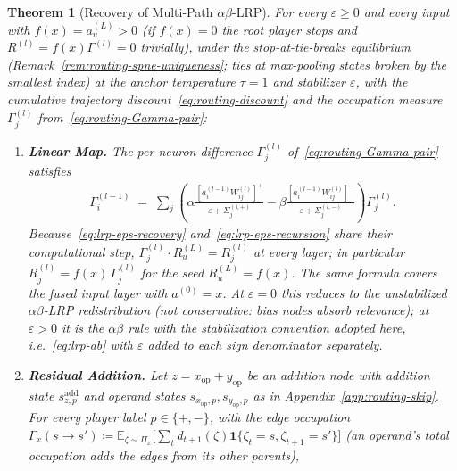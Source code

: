\documentclass[twoside]{article}
\newif\ifch \chfalse
\newcommand{\ch}[1]{\ifch\textcolor{magenta}{#1}\else#1\fi}
\providecommand{\E}{}
\renewcommand{\E}{\mathbb{E}}
\newcommand{\1}{\mathbf{1}}
\newtheorem{theorem}{Theorem}
\begin{document}
\begin{theorem}[Recovery of Multi-Path $\alpha\beta$-\ac{LRP}]\label{thm:ab-recovery}
For every $\varepsilon \ge 0$ and every input with $f(x)=a_u^{(L)}>0$ (if $f(x)=0$ the root player
stops and $R^{(l)}=f(x)\Gamma^{(l)}=0$ trivially), under the stop-at-tie-breaks equilibrium
(Remark~\ref{rem:routing-spne-uniqueness}; ties at max-pooling states broken by the smallest index)
at the anchor temperature $\tau = 1$ and stabilizer $\varepsilon$, with the cumulative trajectory
discount~\eqref{eq:routing-discount} and the occupation measure $\Gamma_j^{(l)}$
from~\eqref{eq:routing-Gamma-pair}:
\begin{enumerate}
    \item \textbf{Linear Map.} The per-neuron difference $\Gamma^{(l)}_j$ of~\eqref{eq:routing-Gamma-pair}
        satisfies
        \begin{align}\label{eq:lrp-eps-recovery}
            \Gamma^{(l-1)}_i
            \;=\; \sum_j \left(
            \alpha \frac{[a_i^{(l-1)} W_{ij}^{(l)}]^+}{\varepsilon + \Sigma_j^{(l,+)}}
            -
            \beta \frac{[a_i^{(l-1)} W_{ij}^{(l)}]^-}{\varepsilon + \Sigma_j^{(l,-)}}
            \right) \Gamma^{(l)}_j.
        \end{align}
        Because~\eqref{eq:lrp-eps-recovery} and~\eqref{eq:lrp-eps-recursion} share their computational
        step, $\Gamma^{(l)}_j \cdot R_u^{(L)} = R^{(l)}_j$ at every layer; in particular $R^{(l)}_j =
            f(x)\,\Gamma^{(l)}_j$ for the seed $R^{(L)}_u = f(x)$. The same formula covers the fused input
        layer with $a^{(0)} = x$. At $\varepsilon = 0$ this reduces to the unstabilized
        $\alpha\beta$-\ac{LRP} redistribution (not conservative: bias nodes absorb relevance); at
        $\varepsilon > 0$ \ch{it is the $\alpha\beta$ rule with the stabilization convention adopted here,
        i.e.\ \eqref{eq:lrp-ab} with $\varepsilon$ added to each sign denominator separately.}
    \item \textbf{Residual Addition.} Let $z = x_{\mathrm{op}} + y_{\mathrm{op}}$ be an addition node with
        addition state $s^{\mathrm{add}}_{z,p}$ and operand states $s_{x_{\mathrm{op}},p},
            s_{y_{\mathrm{op}},p}$ as in Appendix~\ref{app:routing-skip}. For every player label $p\in\{+,-\}$,
        with the edge occupation $\Gamma_x(s\to s')\coloneqq\E_{\zeta\sim\Pi_x}\bigl[\sum_t
            d_{t+1}(\zeta)\1\{\zeta_t=s,\zeta_{t+1}=s'\}\bigr]$ (an operand's total occupation adds the edges
        from its other parents),
        \begin{align}

\end{align}
\end{enumerate}
\end{theorem}
\end{document}
